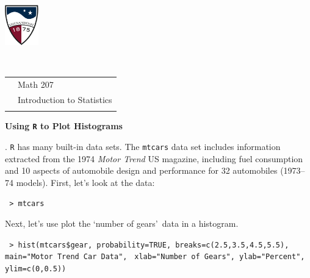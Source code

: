 \documentclass[10pt]{article}
\newcounter{EX}\setcounter{EX}{1}
\newcommand{\EXERCISE}{\arabic{EX}.\stepcounter{EX} }
\begin{document}
\pagestyle{empty}
\lstset{language=R, showspaces=false, showstringspaces=false}

\href{http://www.su.edu}{\includegraphics[height=1.75cm]{sulogo.eps}}
\vspace{-1.69cm}

{\small
\hbox{\ }\hfill\begin{tabular}{cl}
& Math 207\\
& Introduction to Statistics\\
& %
\end{tabular}
}
\setlength{\baselineskip}{1.05\baselineskip}
\bigskip

\begin{center}
\textbf{\large  Using \texttt{R} to Plot Histograms}
\end{center}
\medskip


\newcommand{\SUBX}{\smallskip\hspace{10pt}}
\newcommand{\BSK}{\vspace{.14in}}

\EXERCISE \texttt{R} has many built-in data sets.  The \texttt{mtcars} data set 
includes information extracted from the 1974 \textit{Motor Trend} US magazine, 
including fuel consumption and 10 aspects of automobile design and performance 
for 32 automobiles (1973--74 models).  First, let's look at the data:

\texttt{ > mtcars}\par

Next, let's use plot the \lq number of gears\rq\ data in a histogram.\par

\texttt{ > hist(mtcars\$gear, 
probability=TRUE, breaks=c(2.5,3.5,4.5,5.5), main="Motor Trend Car Data",}
\hphantom{+ }\texttt{  xlab="Number of Gears", ylab="Percent", ylim=c(0,0.5))}\vspace{-9pt}
\end{document}
